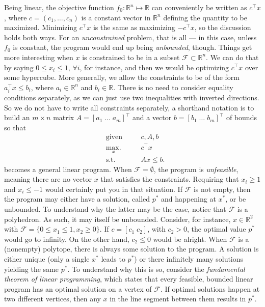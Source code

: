 			Being linear, the objective function $f_0 : \mathbb{R}^n \mapsto \mathbb{R}$ can conveniently be written as $c^\intercal x$, where $c = (c_1, \ldots, c_n)$ is a constant vector in $\mathbb{R}^n$ defining the quantity to be maximized. Minimizing $c^\intercal x$ is the same as maximizing $-c^\intercal x$, so the discussion holds both ways. For an \emph{unconstrained} problem, that is all --- in this case, unless $f_0$ is constant, the program would end up being \emph{unbounded}, though. Things get more interesting when $x$ is constrained to be in a subset $\mathcal{F} \subset \mathbb{R}^n$. We can do that by saying $0 \leq x_i \leq 1, \,\forall i$, for instance, and then we would be optimizing $c^\intercal x$ over some hypercube. More generally, we allow the constraints to be of the form $a_i^\intercal x \leq b_i$, where $a_i \in \mathbb{R}^n$ and $b_i \in \mathbb{R}$. There is no need to consider equality conditions separately, as we can just use two inequalities with inverted directions. So we do not have to write all constraints separately, a shorthand notation is to build an $m \times n$ matrix $A = [a_1 \; \ldots \; a_m]^\intercal$ and a vector $b = [b_1 \; \ldots \; b_m]^\intercal$ of bounds so that
			\begin{subequations}
				\begin{alignat}{2}
					&\text{given}    &\quad & c, A, b \\
					&\underset{x}{\text{max.}}   &	  & c^\intercal x \\
					&\text{s.t.}    &      & Ax \leq b .
				\end{alignat}
				\label{eq:lp}
			\end{subequations}
			becomes a general linear program. When $\mathcal{F} = \emptyset$, the program is \emph{unfeasible}, meaning there are no vector $x$ that satisfies the constraints. Requiring that $x_i \geq 1$ and $x_i \leq -1$ would certainly put you in that situation. If $\mathcal{F}$ is not empty, then the program may either have a solution, called $p^*$ and happening at $x^*$, or be unbounded. To understand why the latter may be the case, notice that $\mathcal{F}$ is a polyhedron. As such, it may itself be unbounded. Consider, for instance, $x \in \mathbb{R}^2$ with $\mathcal{F} = \{ 0 \leq x_1 \leq 1, x_2 \geq 0 \}$. If $c = [c_1 \; c_2]$, with $c_2 > 0$, the optimal value $p^*$ would go to infinity. On the other hand, $c_2 \leq 0$ would be alright. When $\mathcal{F}$ is a (nonempty) polytope, there is always some solution to the program. A solution is either unique (only a single $x^*$ leads to $p^*$) or there infinitely many solutions yielding the same $p^*$. To understand why this is so, consider the \emph{fundamental theorem of linear programming}, which states that every feasible, bounded linear program has an optimal solution on a vertex of $\mathcal{F}$. If optimal solutions happen at two different vertices, then any $x$ in the line segment between them results in $p^*$. 

